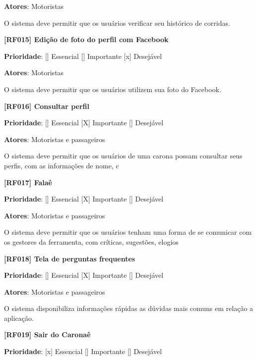 \textbf{Atores}: Motoristas

O sistema deve permitir que os usuários verificar seu histórico de corridas.

\textbf{[RF015] Edição de foto do perfil com Facebook}

\textbf{Prioridade}:      [] Essencial        [] Importante     [x] Desejável 

\textbf{Atores}: Motoristas

O sistema deve permitir que os usuários utilizem sua foto do Facebook.


\textbf{[RF016] Consultar perfil}

\textbf{Prioridade}:      [] Essencial        [X] Importante     [] Desejável 

\textbf{Atores}: Motoristas e passageiros

O sistema deve permitir que os usuários de uma carona possam consultar seus perfis, com as informações de nome, c


\textbf{[RF017] Falaê}

\textbf{Prioridade}:      [] Essencial        [X] Importante     [] Desejável 

\textbf{Atores}: Motoristas e passageiros

O sistema deve permitir que os usuários tenham uma forma de se comunicar com os gestores da ferramenta, com críticas, sugestões, elogios

\textbf{[RF018]  Tela de perguntas frequentes}

\textbf{Prioridade}:      [] Essencial        [X] Importante     [] Desejável 

\textbf{Atores}: Motoristas e passageiros

O sistema disponibiliza informações rápidas as dúvidas mais comuns em relação a aplicação.

\textbf{[RF019] Sair do Caronaê}

\textbf{Prioridade}:      [x] Essencial        [] Importante     [] Desejável 

